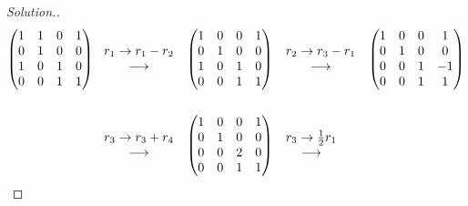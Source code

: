 \documentclass[11pt,a4paper]{article}
\theoremstyle{definition}
\newenvironment{solution}
  {\renewcommand{\qedsymbol}{}\begin{proof}[\textit{Solution}.]}
  {\end{proof}}
\begin{document}
\begin{solution}
\begin{align*}
\begin{pmatrix}
1&1&0&1\\0&1&0&0\\1&0&1&0\\0&0&1&1\\
\end{pmatrix}
& \hspace{0.3cm}
\begin{matrix}
r_1\rightarrow r_1-r_2\\
\longrightarrow\\
\end{matrix}
\hspace{0.3cm}
\begin{pmatrix}
1&0&0&1\\0&1&0&0\\1&0&1&0\\0&0&1&1\\
\end{pmatrix}
\hspace{0.3cm}
\begin{matrix}
r_2\rightarrow r_3-r_1\\ \longrightarrow\\
\end{matrix}
\hspace{0.3cm}
\begin{pmatrix}
1&0&0&1\\0&1&0&0\\0&0&1&-1\\0&0&1&1\\
\end{pmatrix}\\\\
& \hspace{0.3cm}
\begin{matrix}
r_3\rightarrow r_3+r_4\\ \longrightarrow\\
\end{matrix}
\hspace{0.3cm}
\begin{pmatrix}
1&0&0&1\\0&1&0&0\\0&0&2&0\\0&0&1&1\\
\end{pmatrix}
\hspace{0.3cm}
\begin{matrix}
r_3\rightarrow \frac{1}{2}r_1\\ \longrightarrow\\

\end{matrix}
\end{align*}
\end{solution}
\end{document}
